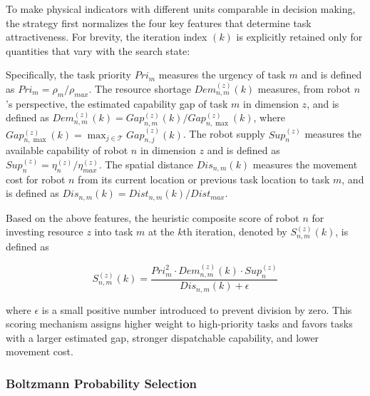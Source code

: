 \documentclass[journal,twoside,web]{ieeecolor}
\begin{document}
To make physical indicators with different units comparable in decision making, the strategy first normalizes the four key features that determine task attractiveness. For brevity, the iteration index $(k)$ is explicitly retained only for quantities that vary with the search state:

Specifically, the task priority $\mathit{Pri}_m$ measures the urgency of task $m$ and is defined as $\mathit{Pri}_m = \rho_m / \rho_{max}$. The resource shortage $\mathit{Dem}_{n,m}^{(z)}(k)$ measures, from robot $n$'s perspective, the estimated capability gap of task $m$ in dimension $z$, and is defined as $\mathit{Dem}_{n,m}^{(z)}(k) = Gap_{n,m}^{(z)}(k) / Gap_{n,\max}^{(z)}(k)$, where $Gap_{n,\max}^{(z)}(k) = \max_{j \in \mathcal{T}} Gap_{n,j}^{(z)}(k)$. The robot supply $\mathit{Sup}_n^{(z)}$ measures the available capability of robot $n$ in dimension $z$ and is defined as $\mathit{Sup}_n^{(z)} = \eta_n^{(z)} / \eta_{max}^{(z)}$. The spatial distance $\mathit{Dis}_{n,m}(k)$ measures the movement cost for robot $n$ from its current location or previous task location to task $m$, and is defined as $\mathit{Dis}_{n,m}(k) = Dist_{n,m}(k) / Dist_{max}$.

Based on the above features, the heuristic composite score of robot $n$ for investing resource $z$ into task $m$ at the $k$th iteration, denoted by $S_{n,m}^{(z)}(k)$, is defined as

\begin{equation}
S_{n,m}^{(z)}(k) = \frac{\mathit{Pri}_m^2 \cdot \mathit{Dem}_{n,m}^{(z)}(k) \cdot \mathit{Sup}_n^{(z)}}{\mathit{Dis}_{n,m}(k) + \epsilon}
\label{eq:heuristic_score}
\end{equation}

where $\epsilon$ is a small positive number introduced to prevent division by zero. This scoring mechanism assigns higher weight to high-priority tasks and favors tasks with a larger estimated gap, stronger dispatchable capability, and lower movement cost.

\subsubsection{Boltzmann Probability Selection}
\end{document}
